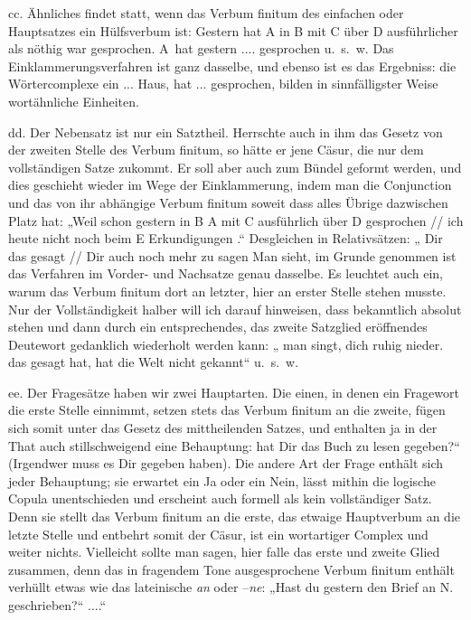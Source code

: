 cc. Ähnliches findet statt, wenn das Verbum finitum des einfachen oder Hauptsatzes ein Hülfsverbum ist: Gestern hat A in B mit C über D ausführlicher als nöthig war gesprochen. A~hat gestern .... gesprochen u.~s.~w. Das Einklammerungsverfahren ist ganz dasselbe, und ebenso ist es das Ergebniss: die Wörtercomplexe ein ... Haus, hat ... gesprochen, bilden in sinnfälligster Weise wortähnliche Einheiten.

dd. Der Nebensatz ist nur ein Satztheil. Herrschte auch in ihm das Gesetz von der zweiten Stelle des Verbum finitum, so hätte er jene Cäsur, die nur dem vollständigen Satze zukommt. Er soll aber auch zum Bündel geformt werden, und dies geschieht wieder im Wege der Einklammerung, indem man die Conjunction und das von ihr abhängige Verbum finitum soweit  dass alles Übrige dazwischen Platz hat: „Weil schon gestern in B A mit C ausführlich über D gesprochen  //  ich heute nicht noch beim E Erkundigungen .“ Desgleichen in Relativsätzen: „ Dir das gesagt  //  Dir auch noch mehr zu sagen  Man sieht, im Grunde genommen ist das Verfahren im Vorder- und Nachsatze genau dasselbe. Es leuchtet auch ein, warum das Verbum finitum dort an letzter, hier an erster Stelle stehen musste. Nur der Vollständigkeit halber will ich darauf hinweisen, dass bekanntlich  absolut stehen und dann durch ein entsprechendes, das zweite Satzglied eröffnendes Deutewort gedanklich wiederholt werden kann: „ man singt,   dich ruhig nieder.  das gesagt hat,  hat die Welt nicht gekannt“ u.~s.~w.

ee. Der Fragesätze haben wir zwei Hauptarten. Die einen, in denen ein Fragewort die erste Stelle einnimmt, setzen stets das Verbum finitum an die zweite, fügen sich somit unter das Gesetz des mittheilenden Satzes, und enthalten ja in der That auch stillschweigend eine Behauptung:  hat Dir das Buch zu lesen gegeben?“ (Irgendwer muss es Dir gegeben haben). Die andere Art der Frage enthält sich jeder Behauptung; sie erwartet ein Ja oder ein Nein, lässt mithin die logische Copula unentschieden und erscheint auch formell als kein vollständiger Satz. Denn sie stellt das Verbum finitum an die erste, das etwaige Haupt\label{fp.450}verbum an die letzte Stelle und entbehrt somit der Cäsur, ist ein \label{sp.469} wortartiger Complex und weiter nichts. Vielleicht sollte man sagen, hier falle das erste und zweite Glied zusammen, denn das in fragendem Tone ausgesprochene Verbum finitum enthält verhüllt etwas wie das lateinische \textit{an} oder –\textit{ne}: „Hast du gestern den Brief an N. geschrieben?“  ....“

